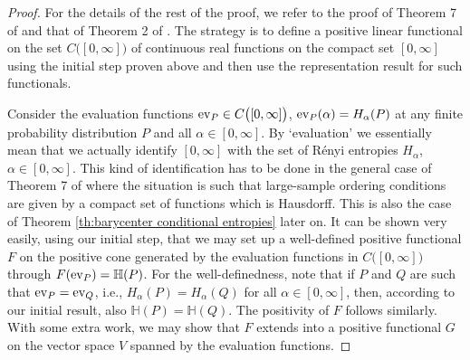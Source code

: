 \documentclass[aps,pra,11pt,onecolumn,nofootinbib,tightenlines]{revtex4-2}
\theoremstyle{definition}
\newcommand{\mb}[1]{\mathbb{#1}}
\begin{document}
\begin{proof}
    For the details of the rest of the proof, we refer to the proof of Theorem 7 of \cite{haapasalo_inprep} and that of Theorem 2 of \cite{mu21_renyi}. The strategy is to define a positive linear functional on the set $C\big([0,\infty]\big)$ of continuous real functions on the compact set $[0,\infty]$ using the initial step proven above and then use the representation result for such functionals.

    Consider the evaluation functions ${\rm ev}_P\in C\big([0,\infty]\big)$, ${\rm ev}_P(\alpha)=H_\alpha(P)$ at any finite probability distribution $P$ and all $\alpha\in[0,\infty]$. By `evaluation' we essentially mean that we actually identify $[0,\infty]$ with the set of R\'{e}nyi entropies $H_\alpha$, $\alpha\in[0,\infty]$. This kind of identification has to be done in the general case of Theorem 7 of \cite{haapasalo_inprep} where the situation is such that large-sample ordering conditions are given by a compact set of functions which is Hausdorff. This is also the case of Theorem \ref{th:barycenter conditional entropies} later on. It can be shown very easily, using our initial step, that we may set up a well-defined positive functional $F$ on the positive cone generated by the evaluation functions in $C\big([0,\infty]\big)$ through $F({\rm ev}_P)=\mb H(P)$. For the well-definedness, note that if $P$ and $Q$ are such that ${\rm ev}_P={\rm ev}_Q$, i.e., $H_\alpha(P)=H_\alpha(Q)$ for all $\alpha\in[0,\infty]$, then, according to our initial result, also $\mb H(P)=\mb H(Q)$. The positivity of $F$ follows similarly. With some extra work, we may show that $F$ extends into a positive functional $G$ on the vector space $V$ spanned by the evaluation functions.


\end{proof}
\end{document}
